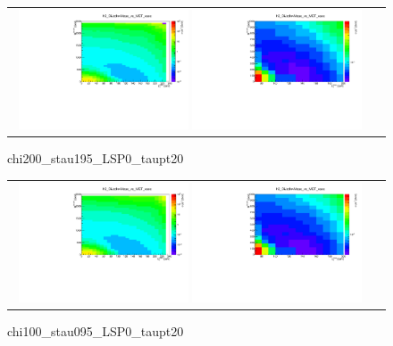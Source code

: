 \begin{figure}[tbh!]
	\centering
	\begin{tabular}{cc}
		\includegraphics[width=0.48\textwidth]{analysis/pics/chi200_stau195_LSP0_taupt20.pdf}
		\includegraphics[width=0.48\textwidth]{analysis/pics/chi200_stau195_LSP0_taupt20_zoom.pdf} 		
	\end{tabular}
	\caption{chi200\_stau195\_LSP0\_taupt20}
\end{figure}

\begin{figure}[tbh!]
	\centering
	\begin{tabular}{cc}
		\includegraphics[width=0.48\textwidth]{analysis/pics/chi100_stau095_LSP0_taupt20.pdf}
		\includegraphics[width=0.48\textwidth]{analysis/pics/chi100_stau095_LSP0_taupt20_zoom.pdf} 		
	\end{tabular}
	\caption{chi100\_stau095\_LSP0\_taupt20}
\end{figure}
